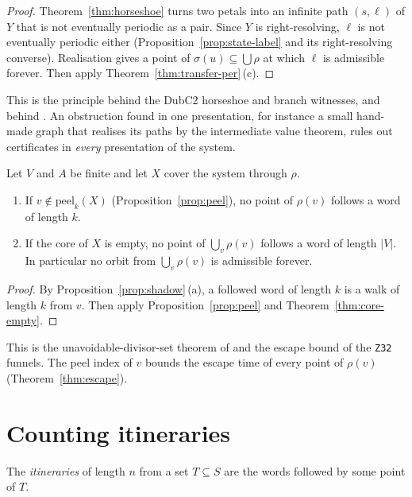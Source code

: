 \begin{proof}
Theorem~\ref{thm:horseshoe} turns two petals into an infinite path \((s,\ell)\) of \(Y\) that
is not eventually periodic as a pair. Since \(Y\) is right-resolving, \(\ell\) is not eventually
periodic either (Proposition~\ref{prop:state-label} and its right-resolving converse).
Realisation gives a point of \(\sigma(u)\subseteq\bigcup\rho\) at which \(\ell\) is admissible
forever. Then apply Theorem~\ref{thm:transfer-per}\,(c).
\end{proof}

This is the principle behind the DubC2 horseshoe and branch witnesses, and behind
\cite[Thm.~42]{Oda26}. An obstruction found in one presentation, for instance a small
hand-made graph that realises its paths by the intermediate value theorem, rules out
certificates in \emph{every} presentation of the system.

\begin{theorem}[escape]\label{thm:transfer-escape}
Let \(V\) and \(A\) be finite and let \(X\) cover the system through \(\rho\).
\begin{enumerate}[label=(\alph*)]
\item If \(v\notin\mathrm{peel}_k(X)\) (Proposition~\ref{prop:peel}), no point of \(\rho(v)\)
  follows a word of length \(k\).
\item If the core of \(X\) is empty, no point of \(\bigcup_v\rho(v)\) follows a word of length
  \(|V|\). In particular no orbit from \(\bigcup_v\rho(v)\) is admissible forever.
\end{enumerate}
\end{theorem}

\begin{proof}
By Proposition~\ref{prop:shadow}\,(a), a followed word of length \(k\) is a walk of length
\(k\) from \(v\). Then apply Proposition~\ref{prop:peel} and Theorem~\ref{thm:core-empty}.
\end{proof}

This is the unavoidable-divisor-set theorem of \cite{DubOst06} and the escape bound of the
\texttt{Z32} funnels. The peel index of \(v\) bounds the escape time of every point of
\(\rho(v)\) (Theorem~\ref{thm:escape}).

\section{Counting itineraries}

The \emph{itineraries} of length \(n\) from a set \(T\subseteq S\) are the words followed by
some point of \(T\).

